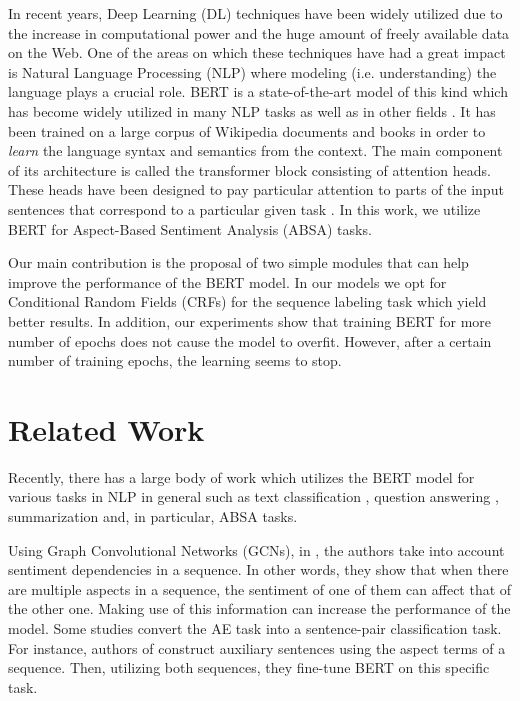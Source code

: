 \documentclass{article}
\begin{document}
In recent years, Deep Learning (DL) techniques have been widely utilized due to the increase in computational power and the huge amount of freely available data on the Web. One of the areas on which these techniques have had a great impact is Natural Language Processing (NLP) where modeling (i.e. understanding) the language plays a crucial role. BERT \cite{devlin2019bert} is a state-of-the-art model of this kind  which has become widely utilized in many NLP tasks \cite{kantor2019learning, davison2019commonsense} as well as in other fields \cite{peng2019transfer, alsentzer2019publicly}. It has been trained on a large corpus of Wikipedia documents and books in order to \textit{learn} the language syntax and semantics from the context. The main component of its architecture is called the transformer \cite{vaswani2017attention} block consisting of attention heads. These heads have been designed to pay particular attention to parts of the input sentences that correspond to a particular given task \cite{vig2019analyzing}. In this work, we utilize BERT for Aspect-Based Sentiment Analysis (ABSA) tasks.

Our main contribution is the proposal of two simple modules that can help improve the performance of the BERT model. In our models we opt for Conditional Random Fields (CRFs) for the sequence labeling task which yield better results. In addition, our experiments show that training BERT for more number of epochs does not cause the model to overfit. However, after a certain number of training epochs, the learning seems to stop. 

\section{Related Work}
Recently, there has a large body of work which utilizes the BERT model for various tasks in NLP in general such as text classification \cite{sun2019fine}, question answering \cite{yang2019data}, summarization \cite{liu2019fine} and, in particular, ABSA tasks. 

 Using Graph Convolutional Networks (GCNs), in \cite{zhao2020modeling}, the authors take into account sentiment dependencies in a sequence. In other words, they show that when there are multiple aspects in a sequence, the sentiment of one of them can affect that of the other one. Making use of this information can increase the performance of the model. Some studies convert the AE task into a sentence-pair classification task.  For instance, authors of \cite{sun2019utilizing} construct auxiliary sentences using the aspect terms of a sequence. Then, utilizing both sequences, they fine-tune BERT on this specific task. 
\end{document}
